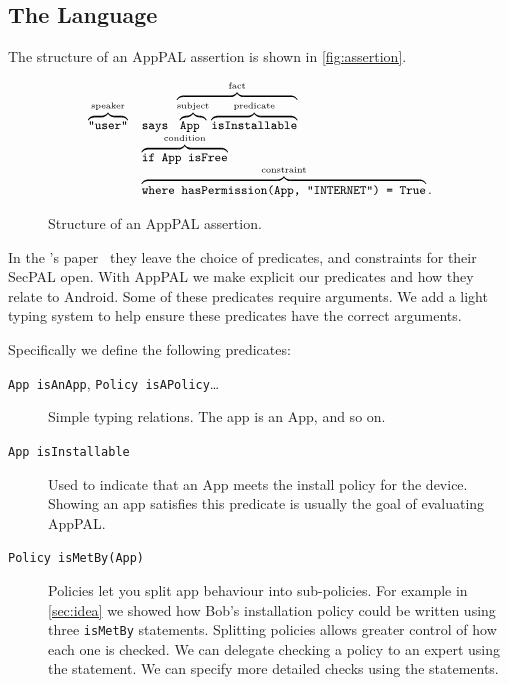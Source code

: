 \documentclass[a4paper]{scrartcl}
\begin{document}
\subsection{The Language}

The structure of an AppPAL assertion is shown in \autoref{fig:assertion}.

\begin{figure}
  \centering
  \begin{equation*}\small
    \begin{array}{r l}
      \overbrace{\text{\ttfamily "user"}}^{\text{speaker}} & 
      \text{\ttfamily says }\overbrace{\overbrace{\text{\ttfamily App }}^{\text{subject}}\overbrace{\text{\ttfamily isInstallable}}^{\text{predicate}}}^{\text{fact}} \\
      & \overbrace{\text{\ttfamily if App isFree}}^{\text{condition}} \\
      & \overbrace{\text{\ttfamily where hasPermission(App, "INTERNET") = True}}^{\text{constraint}}. 
    \end{array}
  \end{equation*}
  \caption{Structure of an AppPAL assertion.}
\label{fig:assertion}
\end{figure}

In the \citeauthor{Becker:2006vh}'s paper~\citep{Becker:2006vh} they leave the choice of predicates, and constraints for their SecPAL open.
With AppPAL we make explicit our predicates and how they relate to Android.  
Some of these predicates require arguments.
We add a light typing system to help ensure these predicates have the correct arguments.

Specifically we define the following predicates:
\begin{description}
  \item[\texttt{App isAnApp}, \texttt{Policy isAPolicy}\ldots] 
    Simple typing relations.  
    The app  is an App, and so on.
  
  \item[\texttt{App isInstallable}]
    Used to indicate that an App meets the install policy for the device.
    Showing an app satisfies this predicate is usually the goal of evaluating AppPAL.

  \item[\texttt{Policy isMetBy(App)}]
    Policies let you split app behaviour into sub-policies.
    For example in \autoref{sec:idea} we showed how Bob's installation policy could be written using three \texttt{isMetBy} statements.
    Splitting policies allows greater control of how each one is checked.
    We can delegate checking a policy to an expert using the  statement.
    We can specify more detailed checks using the  statements.
\end{description}
\end{document}
